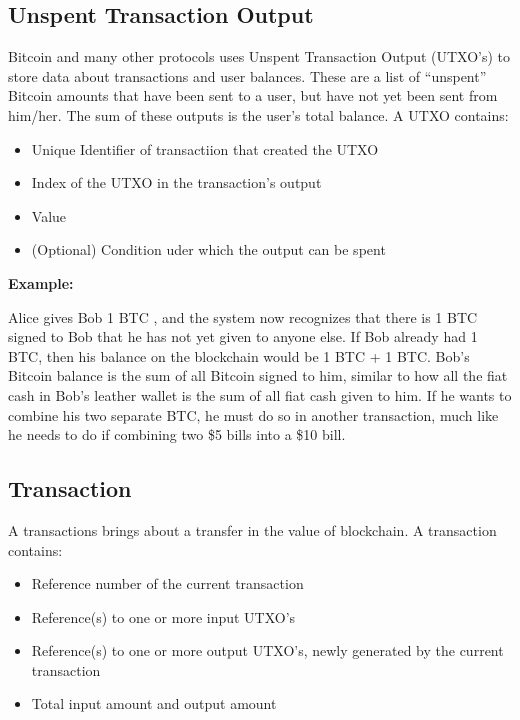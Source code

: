 \documentclass{article}
\begin{document}
\subsection{Unspent Transaction Output}
Bitcoin and many other protocols uses Unspent Transaction Output (UTXO's) to store data about transactions and user balances. These are a list of “unspent” Bitcoin amounts that have been sent to a user, but have not yet been sent from him/her. The sum of these outputs is the user’s total balance. A UTXO contains:
\begin{itemize}
    \item Unique Identifier of transactiion that created the UTXO
    \item Index of the UTXO in the transaction's output
    \item Value 
    \item (Optional) Condition uder which the output can be spent
    \end{itemize}
\textbf{Example:}\par
Alice gives Bob 1 BTC , and the system now recognizes that there is 1 BTC signed to Bob that he has not yet given to anyone else. If Bob already had 1 BTC, then his balance on the blockchain would be 1 BTC + 1 BTC. Bob’s Bitcoin balance is the sum of all Bitcoin signed to him, similar to how all the fiat cash in Bob’s leather wallet is the sum of all fiat cash given to him. If he wants to combine his two separate BTC, he must do so in another transaction, much like he needs to do if combining two \$5 bills into a \$10 bill.

\subsection{Transaction}
A transactions brings about a transfer in the value of blockchain. A transaction contains:
\begin{itemize}
    \item Reference number of the current transaction
    \item Reference(s) to one or more input UTXO's
    \item Reference(s) to one or more output UTXO's, newly generated by the current transaction
    \item Total input amount and output amount
\end{itemize}
\end{document}
